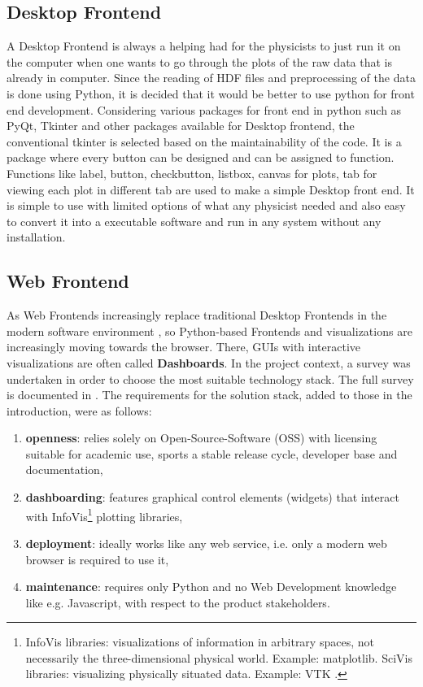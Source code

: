 \subsection{Desktop Frontend}
\label{sec:desktop-frontend}
A Desktop Frontend is always a helping had for the physicists to just run it on the computer when one wants to go through the plots of the raw data that is already in computer. 
Since the reading of HDF files and preprocessing of the data is done using Python, it is decided that it would be better to use python for front end development. Considering various packages for front end in python such as PyQt, Tkinter and other packages available for Desktop frontend, the conventional tkinter is selected based on the maintainability of the code. It is a package where every button can be designed and can be assigned to function.
Functions like label, button, checkbutton, listbox, canvas for plots, tab for viewing each plot in different tab are used to make a simple Desktop front end. It is simple to use with limited options of what any physicist needed and also easy to convert it into a executable software and run in any system without any installation.

\subsection{Web Frontend}
\label{sec:web-frontend}

As Web Frontends increasingly replace traditional Desktop Frontends in the
modern software environment \cite{web-vs-desktop}, so Python-based Frontends and
visualizations are increasingly moving towards the browser. There, GUIs with
interactive visualizations are often called \textbf{Dashboards}. In the project
context, a survey was undertaken in order to choose the most suitable technology
stack. The full survey is documented in \cite{jw-notes}. The requirements for
the solution stack, added to those in the introduction, were as follows:

\begin{enumerate}
\item \textbf{openness}: relies solely on Open-Source-Software (OSS) with
    licensing suitable for academic use, sports a stable release cycle, developer
    base and documentation,
\item \textbf{dashboarding}: features graphical control elements (widgets) that
    interact with InfoVis\footnote{InfoVis libraries: visualizations of
      information in arbitrary spaces, not necessarily the three-dimensional
      physical world. Example: matplotlib. SciVis libraries: visualizing
      physically situated data. Example: VTK \cite{python-viz-2018}.} plotting
    libraries,
\item \textbf{deployment}: ideally works like any web service, i.e. only a
    modern web browser is required to use it,
\item \textbf{maintenance}: requires only Python and no Web Development
    knowledge like e.g. Javascript, with respect to the product stakeholders.
\end{enumerate}

